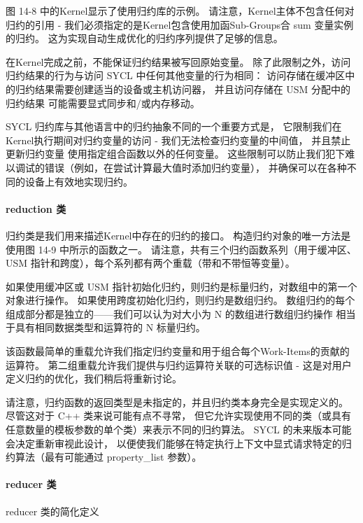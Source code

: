 图 14-8 中的Kernel显示了使用归约库的示例。 
请注意，Kernel主体不包含任何对归约的引用 - 我们必须指定的是Kernel包含使用加函Sub-Groups合 sum 变量实例的归约。 
这为实现自动生成优化的归约序列提供了足够的信息。

在Kernel完成之前，不能保证归约结果被写回原始变量。 
除了此限制之外，访问归约结果的行为与访问 SYCL 中任何其他变量的行为相同：
访问存储在缓冲区中的归约结果需要创建适当的设备或主机访问器，
并且访问存储在 USM 分配中的归约结果 可能需要显式同步和/或内存移动。

SYCL 归约库与其他语言中的归约抽象不同的一个重要方式是，
它限制我们在Kernel执行期间对归约变量的访问 - 我们无法检查归约变量的中间值，
并且禁止更新归约变量 使用指定组合函数以外的任何变量。 
这些限制可以防止我们犯下难以调试的错误（例如，在尝试计算最大值时添加归约变量），
并确保可以在各种不同的设备上有效地实现归约。

\paragraph{reduction 类}

{\color{red}}

归约类是我们用来描述Kernel中存在的归约的接口。 构造归约对象的唯一方法是使用图 14-9 中所示的函数之一。 
请注意，共有三个归约函数系列（用于缓冲区、USM 指针和跨度），每个系列都有两个重载（带和不带恒等变量）。

如果使用缓冲区或 USM 指针初始化归约，则归约是标量归约，对数组中的第一个对象进行操作。 
如果使用跨度初始化归约，则归约是数组归约。 
数组归约的每个组成部分都是独立的——我们可以认为对大小为 N 的数组进行数组归约操作
相当于具有相同数据类型和运算符的 N 标量归约。

该函数最简单的重载允许我们指定归约变量和用于组合每个Work-Items的贡献的运算符。 
第二组重载允许我们提供与归约运算符关联的可选标识值 - 这是对用户定义归约的优化，我们稍后将重新讨论。

请注意，归约函数的返回类型是未指定的，并且归约类本身完全是实现定义的。 
尽管这对于 C++ 类来说可能有点不寻常，
但它允许实现使用不同的类（或具有任意数量的模板参数的单个类）来表示不同的归约算法。 
SYCL 的未来版本可能会决定重新审视此设计，
以便使我们能够在特定执行上下文中显式请求特定的归约算法（最有可能通过 property\_list 参数）。

\paragraph{reducer 类}

{\color{red} reducer 类的简化定义}

